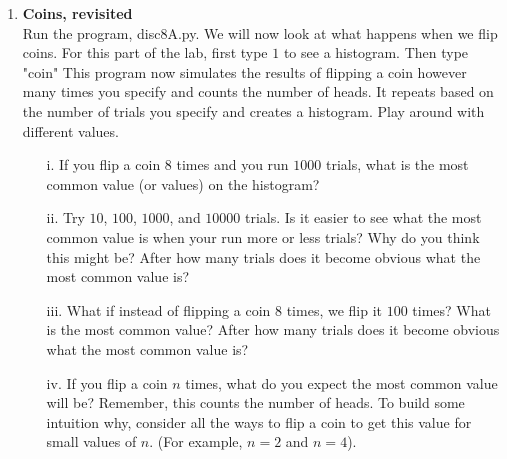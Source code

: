 \documentclass[11pt]{article}
\newif\ifsolutions
\begin{document}
\begin{enumerate}


\item {\bf Coins, revisited}   \\
Run the program, disc8A.py. We will now look at what happens when we flip coins. For this part of the lab, first type $1$ to see a histogram. Then type "coin" This program now simulates the results of flipping a coin however many times you specify and counts the number of heads. It repeats based on the number of trials you specify and creates a histogram. Play around with different values.

\ifsolutions
{\color{blue}{Motivation: have students see the LLN in action, how adding more trials makes all these distributions look visually more like a normal distribution. Also, if they have matplotlib installed they can uncomment the relevant lines to get better looking histograms.
}}
\fi

\begin{enumerate}
\item[i.] If you flip a coin $8$ times and you run $1000$ trials, what is the most common value (or values) on the histogram? 

\ifsolutions
{\color{blue}{Solution: It is usually $4$.
}}
\fi

\item[ii.] Try $10$, $100$, $1000$, and $10000$ trials. Is it easier to see what the most common value is when your run more or less trials?  Why do you think this might be? After how many trials does it become obvious what the most common value is?

\ifsolutions
{\color{blue}{Solution: After about $100$ trials, we begin to see $4$ as the most common value.
}}
\fi

\item[iii.] What if instead of flipping a coin $8$ times, we flip it $100$ times? What is the most common value? After how many trials does it become obvious what the most common value is?

\ifsolutions
{\color{blue}{Solution: The most common value is usually $50$. Also, after about $100$ trials we begin to see $50$ as the most common value. 
}}
\fi

\item[iv.] If you flip a coin $n$ times, what do you expect the most common value will be? Remember, this counts the number of heads. To build some intuition why, consider all the ways to flip a coin to get this value for small values of $n$. (For example, $n = 2$ and $n = 4$).


\end{enumerate}
\end{enumerate}
\end{document}
